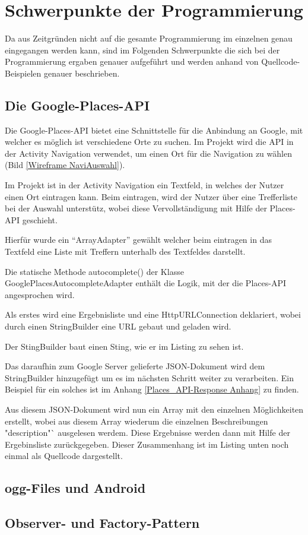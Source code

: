 \section{Schwerpunkte der Programmierung}
Da aus Zeitgr\"unden nicht auf die gesamte Programmierung im einzelnen genau eingegangen werden kann, sind im Folgenden Schwerpunkte die sich bei der Programmierung ergaben genauer aufgef\"uhrt und werden anhand von Quellcode-Beispielen genauer beschrieben.

\subsection{Die Google-Places-API}
Die Google-Places-\ac{API} bietet eine Schnittstelle f\"ur die Anbindung an Google, mit welcher es m\"oglich ist verschiedene Orte zu suchen. Im Projekt wird die \ac{API} in der Activity Navigation verwendet, um einen Ort f\"ur die Navigation zu w\"ahlen (Bild \ref{Wireframe NaviAuswahl}).

Im Projekt ist in der Activity Navigation ein Textfeld, in welches der Nutzer einen Ort eintragen kann. Beim eintragen, wird der Nutzer \"uber eine Trefferliste bei der Auswahl unterst\"utz, wobei diese Vervollst\"andigung mit Hilfe der Places-\ac{API} geschieht.

Hierf\"ur wurde ein "`ArrayAdapter"' gew\"ahlt welcher beim eintragen in das Textfeld eine Liste mit Treffern unterhalb des Textfeldes darstellt.

Die statische Methode autocomplete() der Klasse GooglePlacesAutocompleteAdapter enth\"alt die Logik, mit der die Places-\ac{API} angesprochen wird.

Als erstes wird eine Ergebnisliste und eine HttpURLConnection deklariert, wobei durch einen StringBuilder eine URL gebaut und geladen wird.

Der StingBuilder baut einen Sting, wie er im Listing zu sehen ist.


Das daraufhin zum Google Server gelieferte JSON-Dokument wird dem StringBuilder hinzugef\"ugt um es im n\"achsten Schritt weiter zu verarbeiten. Ein Beispiel f\"ur ein solches ist im Anhang \ref{Places_API-Response Anhang} zu finden.

Aus diesem JSON-Dokument wird nun ein Array mit den einzelnen M\"oglichkeiten erstellt, wobei aus diesem Array wiederum die einzelnen Beschreibungen "description"` ausgelesen werdem. Diese Ergebnisse werden dann mit Hilfe der Ergebinsliste zur\"uckgegeben. Dieser Zusammenhang ist im Listing unten noch einmal als Quellcode dargestellt.
\cite{PlacesAPIGoogle}


\cite{PlacesExample}

\subsection{ogg-Files und Android}
\cite{oggBug} \cite{oogStackOver}

\subsection{Observer- und Factory-Pattern}